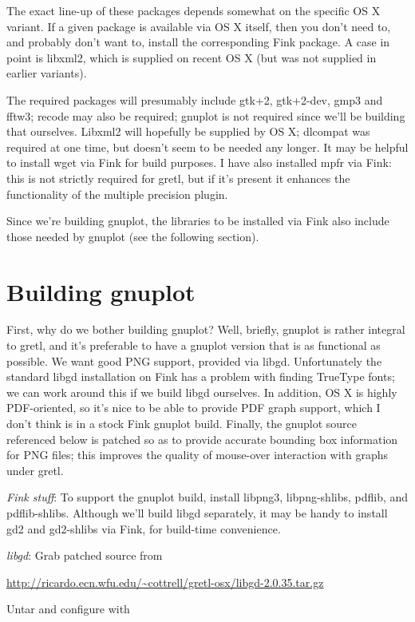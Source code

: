 \documentclass{article}
\begin{document}
The exact line-up of these packages depends somewhat on the specific
OS X variant.  If a given package is available via OS X itself, then
you don't need to, and probably don't want to, install the
corresponding Fink package.  A case in point is libxml2, which is
supplied on recent OS X (but was not supplied in earlier variants).

The required packages will presumably include gtk+2, gtk+2-dev, gmp3
and fftw3; recode may also be required; gnuplot is not required since
we'll be building that ourselves.  Libxml2 will hopefully be supplied
by OS X; dlcompat was required at one time, but doesn't seem to be
needed any longer. It may be helpful to install wget via Fink for
build purposes.  I have also installed mpfr via Fink: this is not
strictly required for gretl, but if it's present it enhances the
functionality of the multiple precision plugin.

Since we're building gnuplot, the libraries to be installed via Fink
also include those needed by gnuplot (see the following section).

\section{Building gnuplot}
\label{sec:gpbuild}

First, why do we bother building gnuplot?  Well, briefly, gnuplot is
rather integral to gretl, and it's preferable to have a gnuplot
version that is as functional as possible.  We want good PNG support,
provided via libgd.  Unfortunately the standard libgd installation on
Fink has a problem with finding TrueType fonts; we can work around
this if we build libgd ourselves.  In addition, OS X is highly
PDF-oriented, so it's nice to be able to provide PDF graph support,
which I don't think is in a stock Fink gnuplot build.  Finally, the
gnuplot source referenced below is patched so as to provide accurate
bounding box information for PNG files; this improves the quality of
mouse-over interaction with graphs under gretl.

\textit{Fink stuff}: To support the gnuplot build, install libpng3,
libpng-shlibs, pdflib, and pdflib-shlibs.  Although we'll build libgd
separately, it may be handy to install gd2 and gd2-shlibs via Fink,
for build-time convenience.

\textit{libgd}: Grab patched source from

\url{http://ricardo.ecn.wfu.edu/~cottrell/gretl-osx/libgd-2.0.35.tar.gz}

Untar and configure with
\end{document}
